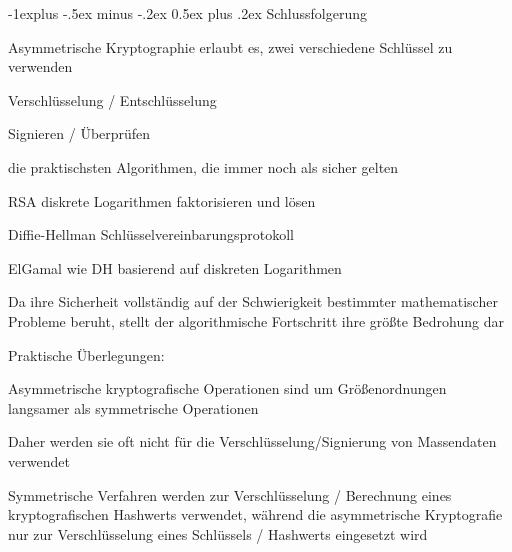 \documentclass[a4paper]{article}
\makeatletter
\renewcommand{\subsection}{\@startsection{subsection}{2}{0mm}%
 {-1explus -.5ex minus -.2ex}%
 {0.5ex plus .2ex}%
 {\normalfont\normalsize\bfseries}}
\makeatother
\begin{document}
\begin{multicols}{3}
      \subsection{Schlussfolgerung}
      \begin{itemize*}
            \item Asymmetrische Kryptographie erlaubt es, zwei verschiedene Schlüssel zu verwenden
            \begin{itemize*}
                  \item Verschlüsselung / Entschlüsselung
                  \item Signieren / Überprüfen
            \end{itemize*}
            \item die praktischsten Algorithmen, die immer noch als sicher gelten
            \begin{description*}
                  \item[RSA] diskrete Logarithmen faktorisieren und lösen
                  \item[Diffie-Hellman] Schlüsselvereinbarungsprotokoll
                  \item[ElGamal] wie DH basierend auf diskreten Logarithmen
            \end{description*}
            \item Da ihre Sicherheit vollständig auf der Schwierigkeit bestimmter mathematischer Probleme beruht, stellt der algorithmische Fortschritt ihre größte Bedrohung dar
            \item Praktische Überlegungen:
            \begin{itemize*}
                  \item Asymmetrische kryptografische Operationen sind um Größenordnungen langsamer als symmetrische Operationen
                  \item Daher werden sie oft nicht für die Verschlüsselung/Signierung von Massendaten verwendet
                  \item Symmetrische Verfahren werden zur Verschlüsselung / Berechnung eines kryptografischen Hashwerts verwendet, während die asymmetrische Kryptografie nur zur Verschlüsselung eines Schlüssels / Hashwerts eingesetzt wird
            \end{itemize*}
      \end{itemize*}

      \columnbreak


\end{multicols}
\end{document}
